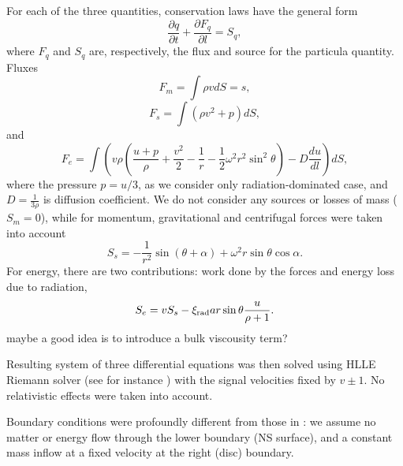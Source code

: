 \documentclass[usenatbib]{mnras}
\newcommand{\pardir}[2]{\ensuremath{\frac{\partial #2}{\partial #1} }}
\begin{document}
For each of the three quantities, conservation laws have the general form
\begin{equation}\label{E:timedep:qcons}
  \pardir{t}{q} + \pardir{l}{F_q} = S_q,
\end{equation}
where $F_q$ and $S_q$ are, respectively, the flux and source for the particula
quantity. Fluxes
\begin{equation}\label{E:timedep:fluxm}
F_m =  \int \rho v dS = s,
\end{equation}
\begin{equation}\label{E:timedep:fluxs}
F_s =  \int \left(\rho v^2 + p\right) dS,
\end{equation}
and
\begin{equation}\label{E:timedep:fluxe}
F_e =  \int \left( v \rho \left(\frac{u + p}{\rho} + \frac{v^2}{2} -\frac{1}{r} -
\frac{1}{2} \omega^2 r^2\sin^2\theta \right) - D \frac{du}{dl}\right) dS,
\end{equation}
where the pressure $p=u/3$, as we consider only radiation-dominated case, and
$D = \frac{1}{3\rho}$ is diffusion coefficient. We do not consider any sources
or losses of mass ($S_m=0$), while for momentum, gravitational and centrifugal forces
were taken into account
\begin{equation}\label{E:timedep:srcs}
S_s = - \frac{1}{r^2}\sin(\theta+\alpha) + \omega^2r \sin\theta \cos\alpha.
\end{equation}
For energy, there are two contributions: work done by the forces and energy
loss due to radiation,
\begin{equation}\label{E:timedep:srce}
  S_e = v S_s - \xi_{\rm rad} a r \sin\theta \frac{u}{\rho+1}.
\end{equation}
\alert{maybe a good idea is to introduce a bulk viscousity term?\\}

Resulting system of three differential equations was then solved using HLLE
Riemann solver (see for instance \citealt{einfeldt}) with the signal
velocities fixed by $v\pm 1$. No relativistic effects were taken into
account. 

Boundary conditions were profoundly different from those in \citet{basko-sunyaev1976}: we
assume no matter or energy flow through the lower boundary (NS surface), and a constant
mass inflow at a fixed velocity at the right (disc) boundary. 




\label{lastpage}
\end{document}
